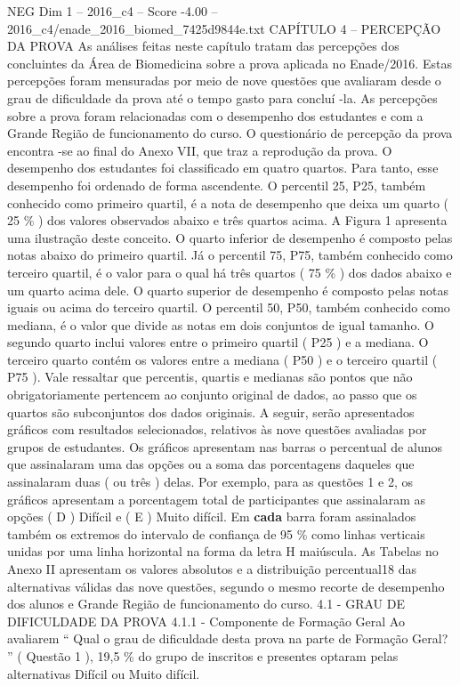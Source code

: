 \begin{textsample}{NEG Dim 1 – 2016\_c4 – Score -4.00 – 2016\_c4/enade\_2016\_biomed\_7425d9844e.txt}  \label{ex:f1_neg_158}
CAPÍTULO 4 – PERCEPÇÃO DA PROVA As análises feitas neste capítulo tratam das percepções dos concluintes da Área de Biomedicina sobre a prova aplicada no Enade/2016.
Estas percepções foram mensuradas por meio de nove questões que avaliaram desde o grau de dificuldade da prova até o tempo gasto para concluí -la.
As percepções sobre a prova foram relacionadas com o desempenho dos estudantes e com a Grande Região de funcionamento do curso.
O questionário de percepção da prova encontra -se ao final do Anexo VII, que traz a reprodução da prova.
O desempenho dos estudantes foi classificado em quatro quartos.
Para tanto, esse desempenho foi ordenado de forma ascendente.
O percentil 25, P25, também conhecido como primeiro quartil, é a nota de desempenho que deixa um quarto ( 25 \% ) dos valores observados abaixo e três quartos acima.
A Figura 1 apresenta uma ilustração deste conceito.
O quarto inferior de desempenho é composto pelas notas abaixo do primeiro quartil.
Já o percentil 75, P75, também conhecido como terceiro quartil, é o valor para o qual há três quartos ( 75 \% ) dos dados abaixo e um quarto acima dele.
O quarto superior de desempenho é composto pelas notas iguais ou acima do terceiro quartil.
O percentil 50, P50, também conhecido como mediana, é o valor que divide as notas em dois conjuntos de igual tamanho.
O segundo quarto inclui valores entre o primeiro quartil ( P25 ) e a mediana.
O terceiro quarto contém os valores entre a mediana ( P50 ) e o terceiro quartil ( P75 ).
Vale ressaltar que percentis, quartis e medianas são pontos que não obrigatoriamente pertencem ao conjunto original de dados, ao passo que os quartos são subconjuntos dos dados originais.
A seguir, serão apresentados gráficos com resultados selecionados, relativos às nove questões avaliadas por grupos de estudantes.
Os gráficos apresentam nas barras o percentual de alunos que assinalaram uma das opções ou a soma das porcentagens daqueles que assinalaram duas ( ou três ) delas.
Por exemplo, para as questões 1 e 2, os gráficos apresentam a porcentagem total de participantes que assinalaram as opções ( D ) Difícil e ( E ) Muito difícil.
Em \textbf{cada} barra foram assinalados também os extremos do intervalo de confiança de 95 \% como linhas verticais unidas por uma linha horizontal na forma da letra H maiúscula.
As Tabelas no Anexo II apresentam os valores absolutos e a distribuição percentual18 das alternativas válidas das nove questões, segundo o mesmo recorte de desempenho dos alunos e Grande Região de funcionamento do curso. 4.1 - GRAU DE DIFICULDADE DA PROVA 4.1.1 - Componente de Formação Geral Ao avaliarem “ Qual o grau de dificuldade desta prova na parte de Formação Geral? ” ( Questão 1 ), 19,5 \% do grupo de inscritos e presentes optaram pelas alternativas Difícil ou Muito difícil.

\end{textsample}
